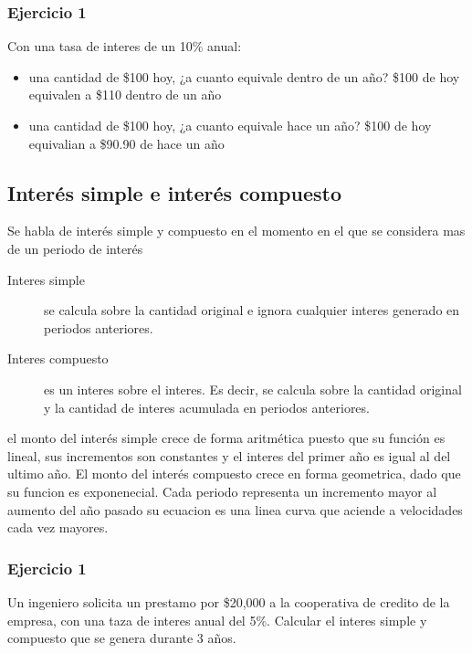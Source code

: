 \documentclass[11pt]{article}
\begin{document}
\subsubsection*{Ejercicio 1}
\label{sec:org074a1bb}
Con una tasa de interes de un 10\% anual:

\begin{itemize}
\item una cantidad de \$100 hoy, ¿a cuanto equivale dentro de un año?
\label{sec:org41b2607}
\$100 de hoy equivalen a \$110 dentro de un año

\item una cantidad de \$100 hoy, ¿a cuanto equivale hace un año?
\label{sec:org1565335}
\$100 de hoy equivalian a \$90.90 de hace un año
\end{itemize}

\subsection*{Interés simple e interés compuesto}
\label{sec:org491d322}
Se habla de interés simple y compuesto en el momento en el que se considera mas de un periodo de interés

\begin{description}
\item[{Interes simple}] se calcula sobre la cantidad original e ignora cualquier interes generado en periodos anteriores.

\item[{Interes compuesto}] es un interes sobre el interes. Es decir, se calcula sobre la cantidad original y la cantidad de interes acumulada en periodos anteriores.
\end{description}

el monto del interés simple crece de forma aritmética puesto que su función es lineal, sus incrementos son constantes y el interes del primer año es igual al del ultimo año. El monto del interés compuesto crece en forma geometrica, dado que su funcion es exponenecial.  Cada periodo representa un incremento mayor al aumento del año pasado su ecuacion es una linea curva que aciende a velocidades cada vez mayores.

\subsubsection*{Ejercicio 1}
\label{sec:orge70980a}
Un ingeniero solicita un prestamo por \$20,000 a la cooperativa de credito de la empresa, con una taza de interes anual del 5\%. Calcular el interes simple y compuesto que se genera durante 3 años. 
\end{document}
